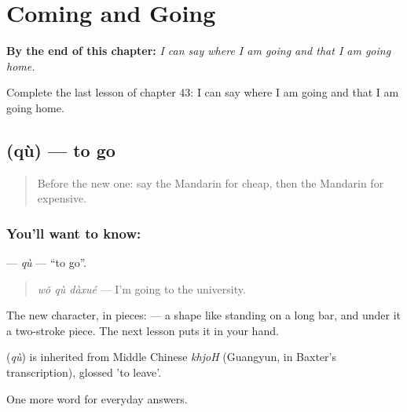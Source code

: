 
\chapter{Coming and Going}
\label{ch:zh-coming-and-going}

\begin{chapteropening}
\textbf{By the end of this chapter:} \emph{I can say where I am going and that I am going home.}

Complete the last lesson of chapter 43: I can say where I am going and that I am going home.
\end{chapteropening}

\section[\texorpdfstring{\zh{去} (qù)}{去 (qù)}]{ (qù) — to go}

\label{lesson:ZH-C43-qu}



\begin{quote}
Before the new one: say the Mandarin for cheap, then the Mandarin for expensive.
\end{quote}

\subsection*{You'll want to know: }
\textbf{} — \emph{qù} — \textquotedblleft{}to go\textquotedblright{}.

\begin{quote}
\textbf{} \emph{wǒ qù dàxué} — I'm going to the university.
\end{quote}

The new character, in pieces:  — a shape like  standing on a long bar, and under it a two-stroke piece. The next lesson puts it in your hand.

\begin{cousinweb}
\textbf{} (\emph{qù}) is inherited from Middle Chinese \emph{khjoH} (Guangyun, in Baxter's transcription), glossed 'to leave'.
\end{cousinweb}

\begin{grammarlens}[title={What you've built}]
One more word for everyday answers.
\end{grammarlens}

